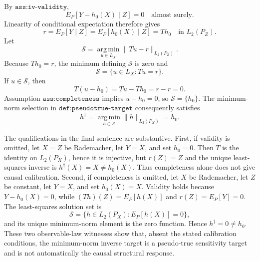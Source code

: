 By \(\texttt{ass:iv-validity}\),
\[
E_P[Y-h_0(X)\mid Z]=0
\quad\text{almost surely}.
\]
Linearity of conditional expectation therefore gives
\[
r=E_P[Y\mid Z]=E_P[h_0(X)\mid Z]=Th_0
\quad\text{in }L_2(P_Z).
\]
Let
\[
\mathcal S=\operatorname*{arg\,min}_{u\in L_X}\|Tu-r\|_{L_2(P_Z)}.
\]
Because \(Th_0=r\), the minimum defining \(\mathcal S\) is zero and
\[
\mathcal S=\{u\in L_X:Tu=r\}.
\]
If \(u\in\mathcal S\), then
\[
T(u-h_0)=Tu-Th_0=r-r=0.
\]
Assumption \(\texttt{ass:completeness}\) implies \(u-h_0=0\), so \(\mathcal S=\{h_0\}\). The minimum-norm selection in \(\texttt{def:pseudotrue-target}\) consequently satisfies
\[
h^\dagger=\operatorname*{arg\,min}_{h\in\mathcal S}\|h\|_{L_2(P_X)}=h_0.
\]

The qualifications in the final sentence are substantive. First, if validity is omitted, let \(X=Z\) be Rademacher, let \(Y=X\), and set \(h_0=0\). Then \(T\) is the identity on \(L_2(P_X)\), hence it is injective, but \(r(Z)=Z\) and the unique least-squares inverse is \(h^\dagger(X)=X\ne h_0(X)\). Thus completeness alone does not give causal calibration. Second, if completeness is omitted, let \(X\) be Rademacher, let \(Z\) be constant, let \(Y=X\), and set \(h_0(X)=X\). Validity holds because \(Y-h_0(X)=0\), while \((Th)(Z)=E_P[h(X)]\) and \(r(Z)=E_P[Y]=0\). The least-squares solution set is
\[
\mathcal S=\{h\in L_2(P_X):E_P[h(X)]=0\},
\]
and its unique minimum-norm element is the zero function. Hence \(h^\dagger=0\ne h_0\). These two observable-law witnesses show that, absent the stated calibration conditions, the minimum-norm inverse target is a pseudo-true sensitivity target and is not automatically the causal structural response.